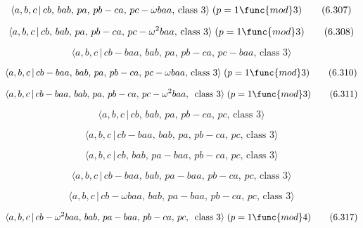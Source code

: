 \documentclass[10pt]{article}
\begin{document}
\begin{equation}
\langle a,b,c\,|\,cb,\,bab,\,pa,\,pb-ca,\,pc-\omega baa,\,\text{class }%
3\rangle\;(p=1 \func{mod} 3)  \tag{6.307}
\end{equation}

\begin{equation}
\langle a,b,c\,|\,cb,\,bab,\,pa,\,pb-ca,\,pc-\omega ^2baa,\,\text{class }%
3\rangle\;(p=1 \func{mod} 3)  \tag{6.308}
\end{equation}

\begin{equation}
\langle a,b,c\,|\,cb-baa,\,bab,\,pa,\,pb-ca,\,pc-baa,\,\text{class }3\rangle
\tag{6.309}
\end{equation}

\begin{equation}
\langle a,b,c\,|\,cb-baa,\,bab,\,pa,\,pb-ca,\,pc-\omega baa,\,\text{class }%
3\rangle\;(p=1 \func{mod} 3)  \tag{6.310}
\end{equation}

\begin{equation}
\langle a,b,c\,|\,cb-baa,\,bab,\,pa,\,pb-ca,\,pc-\omega ^2baa,\,\text{ class 
}3\rangle\;(p=1 \func{mod} 3)  \tag{6.311}
\end{equation}

\begin{equation}
\langle a,b,c\,|\,cb,\,bab,\,pa,\,pb-ca,\,pc,\,\text{class }3\rangle 
\tag{6.312}
\end{equation}

\begin{equation}
\langle a,b,c\,|\,cb-baa,\,bab,\,pa,\,pb-ca,\,pc,\,\text{class }3\rangle 
\tag{6.313}
\end{equation}

\begin{equation}
\langle a,b,c\,|\,cb,\,bab,\,pa-baa,\,pb-ca,\,pc,\,\text{class }3\rangle 
\tag{6.314}
\end{equation}

\begin{equation}
\langle a,b,c\,|\,cb-baa,\,bab,\,pa-baa,\,pb-ca,\,pc,\,\text{class }3\rangle
\tag{6.315}
\end{equation}

\begin{equation}
\langle a,b,c\,|\,cb-\omega baa,\,bab,\,pa-baa,\,pb-ca,\,pc,\,\text{class }%
3\rangle  \tag{6.316}
\end{equation}

\begin{equation}
\langle a,b,c\,|\,cb-\omega ^2baa,\,bab,\,pa-baa,\,pb-ca,\,pc,\,\text{ class 
}3\rangle\;(p=1 \func{mod} 4)  \tag{6.317}
\end{equation}
\end{document}
